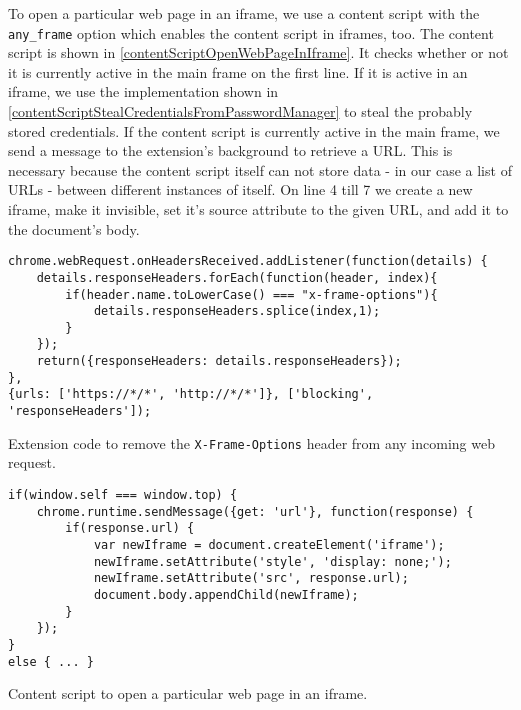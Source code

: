	To open a particular web page in an iframe, we use a content script with the \texttt{any\_frame} option which enables the content script in iframes, too. The content script is shown in \autoref{contentScriptOpenWebPageInIframe}. It checks whether or not it is currently active in the main frame on the first line. If it is active in an iframe, we use the implementation shown in \autoref{contentScriptStealCredentialsFromPasswordManager} to steal the probably stored credentials. If the content script is currently active in the main frame, we send a message to the extension's background to retrieve a URL. This is necessary because the content script itself can not store data - in our case a list of URLs - between different instances of itself. On line 4 till 7 we create a new iframe, make it invisible, set it's source attribute to the given URL, and add it to the document's body. \\
	
	\begin{code}
		\begin{lstlisting}
chrome.webRequest.onHeadersReceived.addListener(function(details) { 
	details.responseHeaders.forEach(function(header, index){
		if(header.name.toLowerCase() === "x-frame-options"){
			details.responseHeaders.splice(index,1);
		}
	});
	return({responseHeaders: details.responseHeaders});
},
{urls: ['https://*/*', 'http://*/*']}, ['blocking', 'responseHeaders']);
\end{lstlisting}
		\caption{Extension code to remove the \texttt{X-Frame-Options} header from any incoming web request.}
		\label{backgroundRemoveXFrameOptionsHeader}
	\end{code} 
	
	\begin{code}
		\begin{lstlisting}
if(window.self === window.top) {
	chrome.runtime.sendMessage({get: 'url'}, function(response) {
		if(response.url) {
			var newIframe = document.createElement('iframe');
			newIframe.setAttribute('style', 'display: none;');
			newIframe.setAttribute('src', response.url);
			document.body.appendChild(newIframe);
		}
	});
}
else { ... }
\end{lstlisting}
		\caption{Content script to open a particular web page in an iframe.}
		\label{contentScriptOpenWebPageInIframe}
	\end{code}
	
